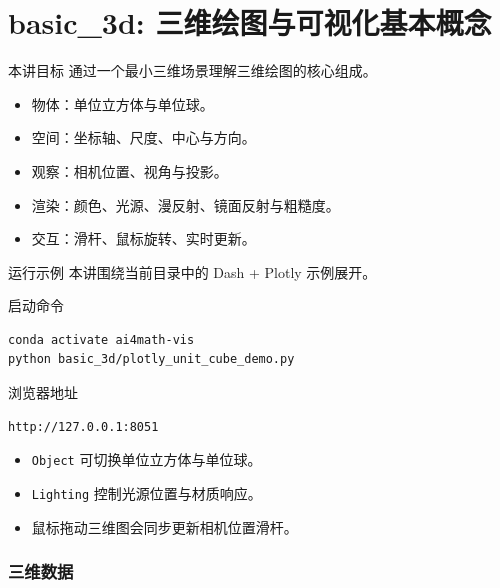 \documentclass[aspectratio=169,11pt]{ctexbeamer}
\begin{document}
\part{basic\_3d: 三维绘图与可视化基本概念}

\begin{frame}{本讲目标}
  通过一个最小三维场景理解三维绘图的核心组成。

  \begin{itemize}
    \item 物体：单位立方体与单位球。
    \item 空间：坐标轴、尺度、中心与方向。
    \item 观察：相机位置、视角与投影。
    \item 渲染：颜色、光源、漫反射、镜面反射与粗糙度。
    \item 交互：滑杆、鼠标旋转、实时更新。
  \end{itemize}
\end{frame}

\begin{frame}[fragile]{运行示例}
  本讲围绕当前目录中的 Dash + Plotly 示例展开。

  \begin{block}{启动命令}
\begin{Verbatim}[fontsize=\small]
conda activate ai4math-vis
python basic_3d/plotly_unit_cube_demo.py
\end{Verbatim}
  \end{block}

  \begin{block}{浏览器地址}
\begin{Verbatim}[fontsize=\small]
http://127.0.0.1:8051
\end{Verbatim}
  \end{block}

  \begin{itemize}
    \item \texttt{Object} 可切换单位立方体与单位球。
    \item \texttt{Lighting} 控制光源位置与材质响应。
    \item 鼠标拖动三维图会同步更新相机位置滑杆。
  \end{itemize}
\end{frame}

\section{三维数据}
\end{document}
